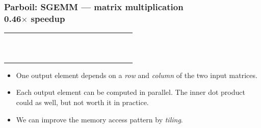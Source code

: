 \documentclass[rgb,dvipsnames]{beamer}
\begin{document}
\begin{frame}
  \frametitle{Parboil: SGEMM --- matrix multiplication \\ 0.46$\times$ speedup}

  \begin{minipage}{0.49\linewidth}
  \begin{tabular}{|c|c|c|c|c|c|c|c|c|c|c|c|c|c|c|c|c|c|}
    \hline
    &&&&&&&\SGt{}&&&&\\\hline
    &&&&&&&\SGt{}&&&&\\\hline
    &&&&&&&\SGt{}&&&&\\\hline
    &&&&&&&\SGt{}&&&&\\\hline
    &&&&&&&\SGt{}&&&&\\\hline
    &&&&&&&\SGt{}&&&&\\\hline
    &&&&&&&\SGt{}&&&&\\\hline
    \SGt{}&\SGt{}&\SGt{}&\SGt{}&\SGt{}&\SGt{}&\SGt{}&\SGg{}&\SGt{}&\SGt{}&\SGt{}&\SGt{}\\\hline
    &&&&&&&\SGt{}&&&&\\\hline
    &&&&&&&\SGt{}&&&&\\\hline
    &&&&&&&\SGt{}&&&&\\\hline
    &&&&&&&\SGt{}&&&&\\\hline
  \end{tabular}
  \end{minipage}
  \begin{minipage}{0.49\linewidth}
    \begin{itemize}
    \item One output element depends on a \textit{row} and
      \textit{column} of the two input matrices.
    \item Each output element can be computed in parallel.  The inner
      dot product could as well, but not worth it in practice.
    \item We can improve the memory access pattern by \textit{tiling}.
    \end{itemize}
  \end{minipage}

\bigskip
\bigskip
\end{frame}
\end{document}
